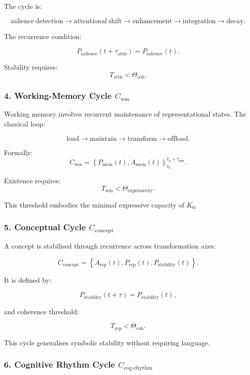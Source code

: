 The cycle is:

\[
  \mathrm{salience\ detection}
  \to
  \mathrm{attentional\ shift}
  \to
  \mathrm{enhancement}
  \to
  \mathrm{integration}
  \to
  \mathrm{decay}.
\]

The recurrence condition:

\[
  P_{\mathrm{salience}}(t+\tau_{\mathrm{attn}}) = P_{\mathrm{salience}}(t).
\]

Stability requires:
\[
  T_{\mathrm{attn}} < \Theta_{\mathrm{coh}}.
\]

\subsubsection{4. Working-Memory Cycle $C_{\mathrm{wm}}$}

Working memory involves recurrent maintenance of representational states.
The classical loop:

\[
 \mathrm{load}
 \to
 \mathrm{maintain}
 \to
 \mathrm{transform}
 \to
 \mathrm{offload}.
\]

Formally:
\[
 C_{\mathrm{wm}} = 
 \left\{
   P_{\mathrm{mem}}(t), A_{\mathrm{mem}}(t)
 \right\}_{t_0}^{t_0+\tau_{\mathrm{wm}}}.
\]

Existence requires:
\[
 T_{\mathrm{wm}} < \Theta_{\mathrm{expressivity}}.
\]

This threshold embodies the minimal expressive capacity of $K_6$.

\subsubsection{5. Conceptual Cycle $C_{\mathrm{concept}}$}

A concept is stabilised through recurrence across transformation axes:

\[
  C_{\mathrm{concept}}
    = \left\{
      A_{\mathrm{rep}}(t),
      P_{\mathrm{rep}}(t),
      P_{\mathrm{stability}}(t)
    \right\}.
\]

It is defined by:

\[
  P_{\mathrm{stability}}(t+\tau) = P_{\mathrm{stability}}(t),
\]

and coherence threshold:

\[
  T_{\mathrm{rep}} < \Theta_{\mathrm{coh}}.
\]

This cycle generalises symbolic stability without requiring language.

\subsubsection{6. Cognitive Rhythm Cycle $C_{\mathrm{cog\text{-}rhythm}}$}

